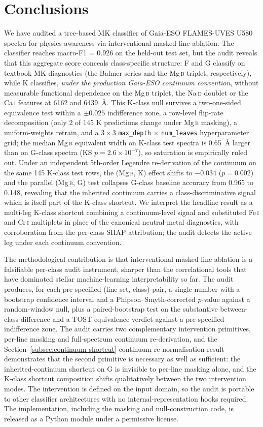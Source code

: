\documentclass[11pt,a4paper]{article}
\newcommand{\Mgb}{Mg\,\textsc{b}\xspace}
\newcommand{\NaD}{Na\,\textsc{d}\xspace}
\newcommand{\CaI}{Ca\,\textsc{i}\xspace}
\newcommand{\FeI}{Fe\,\textsc{i}\xspace}
\newcommand{\CrI}{Cr\,\textsc{i}\xspace}
\begin{document}
\section{Conclusions}
\label{sec:conclusions}

We have audited a tree-based MK classifier of Gaia-ESO FLAMES-UVES U580 spectra for physics-awareness via interventional masked-line ablation. The classifier reaches macro-F1 = 0.926 on the held-out test set, but the audit reveals that this aggregate score conceals class-specific structure: F and G classify on textbook MK diagnostics (the Balmer series and the \Mgb triplet, respectively), while K classifies, \emph{under the production Gaia-ESO continuum convention}, without measurable functional dependence on the \Mgb triplet, the \NaD doublet or the \CaI features at 6162 and 6439~\AA{}. This K-class null survives a two-one-sided equivalence test within a $\pm 0.025$ indifference zone, a row-level flip-rate decomposition (only 2 of 145 K predictions change under \Mgb masking), a uniform-weights retrain, and a $3 \times 3$ \texttt{max\_depth} $\times$ \texttt{num\_leaves} hyperparameter grid; the median \Mgb equivalent width on K-class test spectra is 0.65~\AA{} larger than on G-class spectra (KS $p = 2.6 \times 10^{-7}$), so saturation is empirically ruled out. Under an independent 5th-order Legendre re-derivation of the continuum on the same 145 K-class test rows, the (\Mgb, K) effect shifts to $-0.034$ ($p = 0.002$) and the parallel (\Mgb, G) test collapses G-class baseline accuracy from 0.965 to 0.148, revealing that the inherited continuum carries a class-discriminative signal which is itself part of the K-class shortcut. We interpret the headline result as a multi-leg K-class shortcut combining a continuum-level signal and substituted \FeI and \CrI multiplets in place of the canonical neutral-metal diagnostics, with corroboration from the per-class SHAP attribution; the audit detects the active leg under each continuum convention.

The methodological contribution is that interventional masked-line ablation is a falsifiable per-class audit instrument, sharper than the correlational tools that have dominated stellar machine-learning interpretability so far. The audit produces, for each pre-specified (line set, class) pair, a single number with a bootstrap confidence interval and a Phipson--Smyth-corrected $p$-value against a random-window null, plus a paired-bootstrap test on the substantive between-class difference and a TOST equivalence verdict against a pre-specified indifference zone. The audit carries two complementary intervention primitives, per-line masking and full-spectrum continuum re-derivation, and the Section~\ref{subsec:continuum-shortcut} continuum re-normalisation result demonstrates that the second primitive is necessary as well as sufficient: the inherited-continuum shortcut on G is invisible to per-line masking alone, and the K-class shortcut composition shifts qualitatively between the two intervention modes. The intervention is defined on the input domain, so the audit is portable to other classifier architectures with no internal-representation hooks required. The implementation, including the masking and null-construction code, is released as a Python module under a permissive license.
\end{document}

